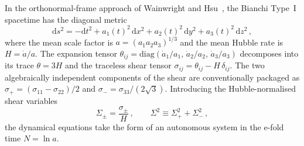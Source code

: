 \documentclass[a4paper,11pt]{article}
\newcommand{\Sig}{\Sigma}
\newcommand{\dd}{\mathrm{d}}
\begin{document}
In the orthonormal-frame approach of Wainwright and Hsu~\cite{WainwrightEllis1997}, the Bianchi Type~I spacetime has the diagonal metric
\begin{equation}
\dd s^2 = -\dd t^2 + a_1(t)^2\,\dd x^2 + a_2(t)^2\,\dd y^2 + a_3(t)^2\,\dd z^2\,,
\end{equation}
where the mean scale factor is $a = (a_1 a_2 a_3)^{1/3}$ and the mean Hubble rate is $H = \dot{a}/a$.  The expansion tensor $\theta_{ij} = \mathrm{diag}(\dot{a}_1/a_1,\,\dot{a}_2/a_2,\,\dot{a}_3/a_3)$ decomposes into its trace $\theta = 3H$ and the traceless shear tensor $\sigma_{ij} = \theta_{ij} - H\,\delta_{ij}$.  The two algebraically independent components of the shear are conventionally packaged as $\sigma_+ = (\sigma_{11} - \sigma_{22})/2$ and $\sigma_- = \sigma_{33}/(2\sqrt{3})$.  Introducing the Hubble-normalised shear variables
\begin{equation}
\Sig_\pm = \frac{\sigma_\pm}{H}\,,\qquad \Sig^2 \equiv \Sig_+^2 + \Sig_-^2\,,
\end{equation}
the dynamical equations take the form of an autonomous system in the e-fold time $N = \ln a$.
\end{document}
